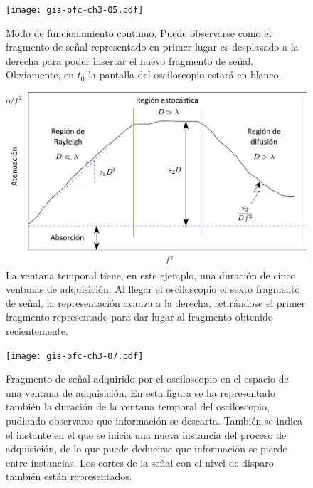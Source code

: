 \documentclass[a4paper,12pt]				{article}
\begin{document}
\clearpage

\begin{figure}
	\begin{center}
		\texttt{[image: gis-pfc-ch3-05.pdf]}
	\end{center}
	\caption[Modo de funcionamiento continuo del osciloscopio]{Modo de
	funcionamiento continuo. Puede observarse como el fragmento de
	señal representado en primer lugar es desplazado a la derecha para
	poder insertar el nuevo fragmento de señal. Obviamente, en $t_0$ la
	pantalla del osciloscopio estará en blanco.}
	\label{fig:digcontosc}
\end{figure}

\begin{figure}
	\begin{center}
		\includegraphics{gis-pfc-ch3-06.pdf}
	\end{center}
	\caption[Modo de funcionamiento continuo]{La ventana temporal
	tiene, en este ejemplo, una duración de cinco ventanas de
	adquisición. Al llegar el osciloscopio el sexto fragmento de señal,
	la representación avanza a la derecha, retirándose el primer
	fragmento representado para dar lugar al fragmento obtenido
	recientemente.}
	\label{fig:digcontosccont}
\end{figure}

\begin{figure}
	\begin{center}
		\texttt{[image: gis-pfc-ch3-07.pdf]}
	\end{center}
	\caption[Fragmento de señal adquirido por el osciloscopio en el
	espacio de una ventana de adquisición]{Fragmento de señal adquirido
	por el osciloscopio en el espacio de una ventana de adquisición. En
	esta figura se ha representado también la duración de la ventana
	temporal del osciloscopio, pudiendo observarse que información se
	descarta. También se indica el instante en el que se inicia una
	nueva instancia del proceso de adquisición, de lo que puede
	deducirse que información se pierde entre instancias. Los cortes de
	la señal con el nivel de disparo también están representados.}
	\label{fig:freesignal}
\end{figure}
\end{document}

